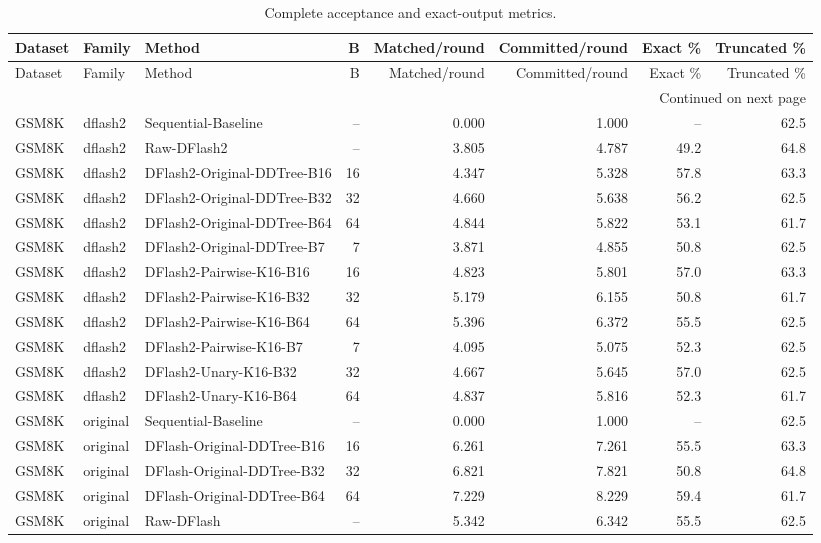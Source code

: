 \begin{longtable}{lllrrrrr}
\caption{Complete acceptance and exact-output metrics.}\label{tab:all-acceptance}\\
\toprule
Dataset & Family & Method & B & Matched/round & Committed/round & Exact \% & Truncated \% \\
\midrule
\endfirsthead
\toprule
Dataset & Family & Method & B & Matched/round & Committed/round & Exact \% & Truncated \% \\
\midrule
\endhead
\midrule
\multicolumn{8}{r}{Continued on next page}\\
\endfoot
\bottomrule
\endlastfoot
GSM8K & dflash2 & Sequential-Baseline & -- & 0.000 & 1.000 & -- & 62.5 \\
GSM8K & dflash2 & Raw-DFlash2 & -- & 3.805 & 4.787 & 49.2 & 64.8 \\
GSM8K & dflash2 & DFlash2-Original-DDTree-B16 & 16 & 4.347 & 5.328 & 57.8 & 63.3 \\
GSM8K & dflash2 & DFlash2-Original-DDTree-B32 & 32 & 4.660 & 5.638 & 56.2 & 62.5 \\
GSM8K & dflash2 & DFlash2-Original-DDTree-B64 & 64 & 4.844 & 5.822 & 53.1 & 61.7 \\
GSM8K & dflash2 & DFlash2-Original-DDTree-B7 & 7 & 3.871 & 4.855 & 50.8 & 62.5 \\
GSM8K & dflash2 & DFlash2-Pairwise-K16-B16 & 16 & 4.823 & 5.801 & 57.0 & 63.3 \\
GSM8K & dflash2 & DFlash2-Pairwise-K16-B32 & 32 & 5.179 & 6.155 & 50.8 & 61.7 \\
GSM8K & dflash2 & DFlash2-Pairwise-K16-B64 & 64 & 5.396 & 6.372 & 55.5 & 62.5 \\
GSM8K & dflash2 & DFlash2-Pairwise-K16-B7 & 7 & 4.095 & 5.075 & 52.3 & 62.5 \\
GSM8K & dflash2 & DFlash2-Unary-K16-B32 & 32 & 4.667 & 5.645 & 57.0 & 62.5 \\
GSM8K & dflash2 & DFlash2-Unary-K16-B64 & 64 & 4.837 & 5.816 & 52.3 & 61.7 \\
GSM8K & original & Sequential-Baseline & -- & 0.000 & 1.000 & -- & 62.5 \\
GSM8K & original & DFlash-Original-DDTree-B16 & 16 & 6.261 & 7.261 & 55.5 & 63.3 \\
GSM8K & original & DFlash-Original-DDTree-B32 & 32 & 6.821 & 7.821 & 50.8 & 64.8 \\
GSM8K & original & DFlash-Original-DDTree-B64 & 64 & 7.229 & 8.229 & 59.4 & 61.7 \\
GSM8K & original & Raw-DFlash & -- & 5.342 & 6.342 & 55.5 & 62.5 \\

\end{longtable}
